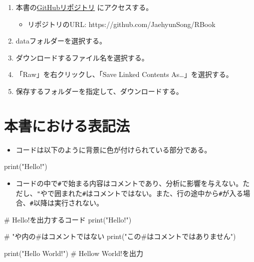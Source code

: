 \documentclass[
  a4paper,
  pandoc,
  ja=standard,
  jafont=haranoaji]{bxjsbook}
\newenvironment{Shaded}{\begin{snugshade}}{\end{snugshade}}
\newcommand{\CommentTok}[1]{\textcolor[rgb]{0.37,0.37,0.37}{#1}}
\newcommand{\FunctionTok}[1]{\textcolor[rgb]{0.28,0.35,0.67}{#1}}
\newcommand{\NormalTok}[1]{\textcolor[rgb]{0.00,0.48,0.65}{#1}}
\newcommand{\StringTok}[1]{\textcolor[rgb]{0.13,0.47,0.30}{#1}}
\providecommand{\tightlist}{%
  \setlength{\itemsep}{0pt}\setlength{\parskip}{0pt}}
\begin{document}
\begin{enumerate}
\def\labelenumi{\arabic{enumi}.}
\tightlist
\item
  本書の\href{https://github.com/JaehyunSong/RBook}{GitHubリポジトリ}
  にアクセスする。

  \begin{itemize}
  \tightlist
  \item
    リポジトリのURL: https://github.com/JaehyunSong/RBook
  \end{itemize}
\item
  dataフォルダーを選択する。
\item
  ダウンロードするファイル名を選択する。
\item
  「Raw」を右クリックし、「Save Linked Contents As\ldots」を選択する。
\item
  保存するフォルダーを指定して、ダウンロードする。
\end{enumerate}

\hypertarget{ux672cux66f8ux306bux304aux3051ux308bux8868ux8a18ux6cd5}{%
\section*{本書における表記法}\label{ux672cux66f8ux306bux304aux3051ux308bux8868ux8a18ux6cd5}}

\begin{itemize}
\tightlist
\item
  コードは以下のように背景に色が付けられている部分である。
\end{itemize}

\begin{Shaded}
\begin{Highlighting}[]
\FunctionTok{print}\NormalTok{(}\StringTok{"Hello!"}\NormalTok{)}
\end{Highlighting}
\end{Shaded}

\begin{itemize}
\tightlist
\item
  コードの中で\texttt{\#}で始まる内容はコメントであり、分析に影響を与えない。ただし、\texttt{"}や\texttt{\textquotesingle{}}で囲まれた\texttt{\#}はコメントではない。また、行の途中から\texttt{\#}が入る場合、\texttt{\#}以降は実行されない。
\end{itemize}

\begin{Shaded}
\begin{Highlighting}[]
\CommentTok{\# Hello!を出力するコード}
\FunctionTok{print}\NormalTok{(}\StringTok{"Hello!"}\NormalTok{)}

\CommentTok{\# "や\textquotesingle{}内の\#はコメントではない}
\FunctionTok{print}\NormalTok{(}\StringTok{"この\#はコメントではありません"}\NormalTok{)}

\FunctionTok{print}\NormalTok{(}\StringTok{"Hello World!"}\NormalTok{) }\CommentTok{\# Hellow World!を出力}
\end{Highlighting}
\end{Shaded}
\end{document}
